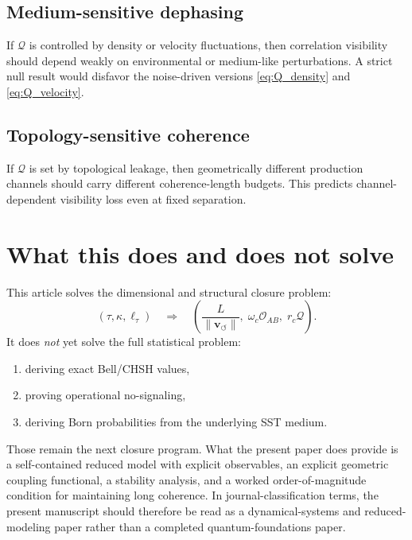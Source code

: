 \documentclass[11pt]{article}
\newcommand{\vnorm}{\lVert \mathbf{v}_{\!\boldsymbol{\circlearrowleft}}\rVert}
\newcommand{\rc}{r_c}
\begin{document}
        \subsection{Medium-sensitive dephasing}
            If \(\mathcal{Q}\) is controlled by density or velocity fluctuations, then correlation visibility should depend weakly on environmental or medium-like perturbations. A strict null result would disfavor the noise-driven versions \eqref{eq:Q_density} and \eqref{eq:Q_velocity}.
        
        \subsection{Topology-sensitive coherence}
            If \(\mathcal{Q}\) is set by topological leakage, then geometrically different production channels should carry different coherence-length budgets. This predicts channel-dependent visibility loss even at fixed separation.
    
    \section{What this does and does not solve}
        
        This article solves the dimensional and structural closure problem:
        \[
            (\tau,\kappa,\ell_\tau)
            \quad\Rightarrow\quad
            \left(
                \frac{L}{\vnorm},
                \;
                \omega_c\mathcal{O}_{AB},
                \;
                \rc\mathcal{Q}
            \right).
        \]
        It does \emph{not} yet solve the full statistical problem:
        \begin{enumerate}[label=(\arabic*)]
    \item deriving exact Bell/CHSH values,
    \item proving operational no-signaling,
    \item deriving Born probabilities from the underlying SST medium.
        \end{enumerate}
        Those remain the next closure program. What the present paper does provide is a self-contained reduced model with explicit observables, an explicit geometric coupling functional, a stability analysis, and a worked order-of-magnitude condition for maintaining long coherence. In journal-classification terms, the present manuscript should therefore be read as a dynamical-systems and reduced-modeling paper rather than a completed quantum-foundations paper.
    
\end{document}
